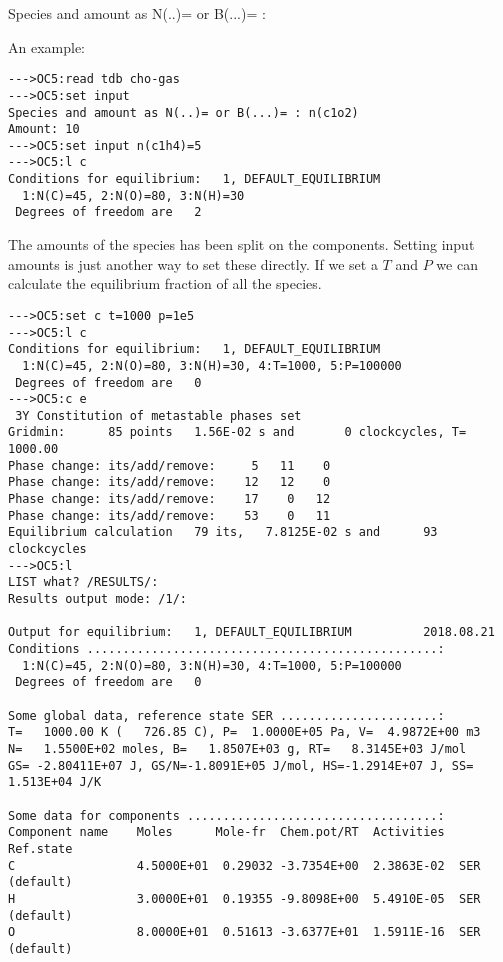 \documentclass[11pt]{article}
\begin{document}
\hypertarget{Species and amounts}{}
Species and amount as N(..)= or B(...)= :

An example:

{\small
\begin{verbatim}
--->OC5:read tdb cho-gas
--->OC5:set input 
Species and amount as N(..)= or B(...)= : n(c1o2)
Amount: 10
--->OC5:set input n(c1h4)=5
--->OC5:l c
Conditions for equilibrium:   1, DEFAULT_EQUILIBRIUM
  1:N(C)=45, 2:N(O)=80, 3:N(H)=30
 Degrees of freedom are   2
\end{verbatim}
}

The amounts of the species has been split on the components.  Setting
input amounts is just another way to set these directly.  If we set a
$T$ and $P$ we can calculate the equilibrium fraction of all the
species.

{\small
\begin{verbatim}
--->OC5:set c t=1000 p=1e5
--->OC5:l c
Conditions for equilibrium:   1, DEFAULT_EQUILIBRIUM
  1:N(C)=45, 2:N(O)=80, 3:N(H)=30, 4:T=1000, 5:P=100000
 Degrees of freedom are   0
--->OC5:c e
 3Y Constitution of metastable phases set
Gridmin:      85 points   1.56E-02 s and       0 clockcycles, T= 1000.00
Phase change: its/add/remove:     5   11    0
Phase change: its/add/remove:    12   12    0
Phase change: its/add/remove:    17    0   12
Phase change: its/add/remove:    53    0   11
Equilibrium calculation   79 its,   7.8125E-02 s and      93 clockcycles
--->OC5:l
LIST what? /RESULTS/:
Results output mode: /1/:

Output for equilibrium:   1, DEFAULT_EQUILIBRIUM          2018.08.21
Conditions .................................................:
  1:N(C)=45, 2:N(O)=80, 3:N(H)=30, 4:T=1000, 5:P=100000
 Degrees of freedom are   0

Some global data, reference state SER ......................:
T=   1000.00 K (   726.85 C), P=  1.0000E+05 Pa, V=  4.9872E+00 m3
N=   1.5500E+02 moles, B=   1.8507E+03 g, RT=   8.3145E+03 J/mol
GS= -2.80411E+07 J, GS/N=-1.8091E+05 J/mol, HS=-1.2914E+07 J, SS= 1.513E+04 J/K

Some data for components ...................................:
Component name    Moles      Mole-fr  Chem.pot/RT  Activities  Ref.state
C                 4.5000E+01  0.29032 -3.7354E+00  2.3863E-02  SER (default)
H                 3.0000E+01  0.19355 -9.8098E+00  5.4910E-05  SER (default)
O                 8.0000E+01  0.51613 -3.6377E+01  1.5911E-16  SER (default)


\end{verbatim}}
\end{document}
